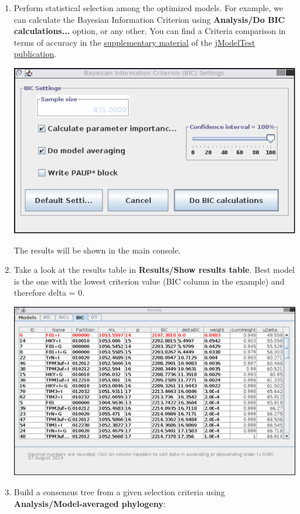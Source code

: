 \begin{enumerate}
\item Perform statistical selection among the optimized models. For example, we can calculate the Bayesian Information Criterion using {\bf Analysis/Do BIC calculations...} option, or any other. You can find a Criteria comparison in terms of accuracy in the \href{http://www.nature.com/nmeth/journal/v9/n8/extref/nmeth.2109-S1.pdf}{supplementary material} of the \href{http://www.nature.com/nmeth/journal/v9/n8/full/nmeth.2109.html}{jModelTest publication}.

\begin{center}
\includegraphics[width=.6\textwidth]{images/bic.pdf}
\end{center}

The results will be shown in the main console.

\item Take a look at the results table in {\bf Results/Show results table}. Best model is the one with the lowest criterion value (BIC column in the example) and therefore delta = 0.

\begin{center}
\includegraphics[width=.9\textwidth]{images/results.pdf}
\end{center}

\item Build a consensus tree from a given selection criteria using {\bf Analysis/Model-averaged phylogeny}:


\end{enumerate}
